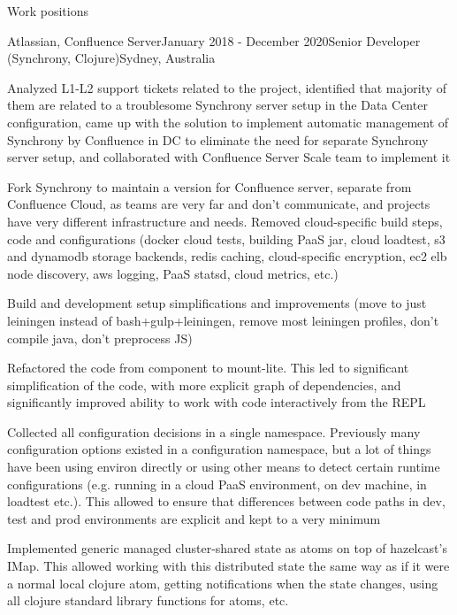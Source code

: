 \documentclass{resume} %
\begin{document}
\begin{rSection}{Work positions}
\begin{rSubsection}{Atlassian, Confluence Server}{January 2018 - December 2020}{Senior Developer (Synchrony, Clojure)}{Sydney, Australia}
\item Analyzed L1-L2 support tickets related to the project, identified that majority of them are related to a troublesome Synchrony server setup in the Data Center configuration, came up with the solution to implement automatic management of Synchrony by Confluence in DC to eliminate the need for separate Synchrony server setup, and collaborated with Confluence Server Scale team to implement it
\item Fork Synchrony to maintain a version for Confluence server, separate from Confluence Cloud, as teams are very far and don't communicate, and projects have very different infrastructure and needs. Removed cloud-specific build steps, code and configurations (docker cloud tests, building PaaS jar, cloud loadtest, s3 and dynamodb storage backends, redis caching, cloud-specific encryption, ec2 elb node discovery, aws logging, PaaS statsd, cloud metrics, etc.)
\item Build and development setup simplifications and improvements (move to just leiningen instead of bash+gulp+leiningen, remove most leiningen profiles, don't compile java, don't preprocess JS)
\item Refactored the code from component to mount-lite. This led to significant simplification of the code, with more explicit graph of dependencies, and significantly improved ability to work with code interactively from the REPL
\item Collected all configuration decisions in a single namespace. Previously many configuration options existed in a configuration namespace, but a lot of things have been using environ directly or using other means to detect certain runtime configurations (e.g. running in a cloud PaaS environment, on dev machine, in loadtest etc.). This allowed to ensure that differences between code paths in dev, test and prod environments are explicit and kept to a very minimum
\item Implemented generic managed cluster-shared state as atoms on top of hazelcast's IMap. This allowed working with this distributed state the same way as if it were a normal local clojure atom, getting notifications when the state changes, using all clojure standard library functions for atoms, etc.

\end{rSubsection}
\end{rSection}
\end{document}
